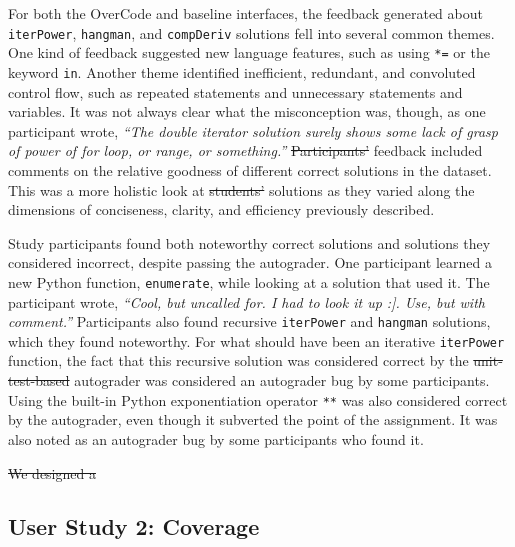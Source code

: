 \documentclass[12pt,twoside]{mitthesis}
\newcommand \codevar[1]{\texttt{#1}}
\providecommand{\DIFaddtex}[1]{{\protect\color{blue}\uwave{#1}}} %
\providecommand{\DIFdeltex}[1]{{\protect\color{red}\sout{#1}}}                      %
\providecommand{\DIFaddbegin}{} %
\providecommand{\DIFaddend}{} %
\providecommand{\DIFdelbegin}{} %
\providecommand{\DIFdelend}{} %
\providecommand{\DIFadd}[1]{\texorpdfstring{\DIFaddtex{#1}}{#1}} %
\providecommand{\DIFdel}[1]{\texorpdfstring{\DIFdeltex{#1}}{}} %
\begin{document}
For both the OverCode and baseline interfaces, the feedback generated about \codevar{iterPower}, \codevar{hangman}, and \codevar{compDeriv} solutions fell into several common themes. One kind of feedback suggested new language features, such as using \codevar{*=} or the keyword \codevar{in}. Another theme identified inefficient, redundant, and convoluted control flow, such as repeated statements and unnecessary statements and variables. It was not always clear what the misconception was, though, as one participant wrote, \textit{``The double iterator solution surely shows some lack of grasp of power of for loop, or range, or something.''} \DIFdelbegin \DIFdel{Participants' }\DIFdelend \DIFaddbegin \DIFadd{Participant }\DIFaddend feedback included comments on the relative goodness of different correct solutions in the dataset. This was a more holistic look at \DIFdelbegin \DIFdel{students' }\DIFdelend \DIFaddbegin \DIFadd{student }\DIFaddend solutions as they varied along the dimensions of conciseness, clarity, and efficiency previously described.

Study participants found both noteworthy correct solutions and solutions they considered incorrect, despite passing the autograder. One participant learned a new Python function, \codevar{enumerate}, while looking at a solution that used it. The participant wrote, \textit{``Cool, but uncalled for. I had to look it up :]. Use, but with comment.''} Participants also found recursive \codevar{iterPower} and \codevar{hangman} solutions, which they found noteworthy. For what should have been an iterative \codevar{iterPower} function, the fact that this recursive solution was considered correct by the \DIFdelbegin \DIFdel{unit-test-based }\DIFdelend autograder was considered an autograder bug by some participants. Using the built-in Python exponentiation operator \codevar{**} was also considered correct by the autograder, even though it subverted the point of the assignment. It was also noted as an autograder bug by some participants who found it.
\DIFdelbegin %
\DIFdelend 

\DIFdelbegin \DIFdel{We designed a }\DIFdelend \DIFaddbegin \subsection{User Study 2: Coverage}
\end{document}
